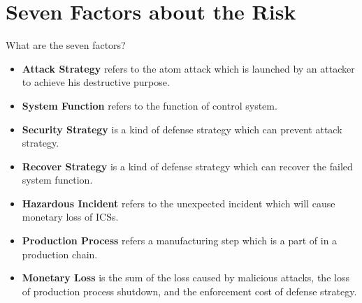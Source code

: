 \documentclass[10pt]{beamer}
\begin{document}
\section{Seven Factors about the Risk}
\begin{frame}{What are the seven factors?}
    \begin{itemize}[<+->]
      \item \textbf{Attack Strategy} refers to the atom attack which is launched by an attacker to achieve his destructive purpose.
      \item \textbf{System Function} refers to the function of control system.
      \item \textbf{Security Strategy} is a kind of defense strategy which can prevent attack strategy.
      \item \textbf{Recover Strategy} is a kind of defense strategy which can recover the failed system function.
      \item \textbf{Hazardous Incident} refers to the unexpected incident which will cause monetary loss of ICSs.
      \item \textbf{Production Process} refers a manufacturing step which is a part of in a production chain.
      \item \textbf{Monetary Loss} is the sum of the loss caused by malicious attacks, the loss of production process shutdown, and the enforcement cost of defense strategy.
    \end{itemize}
\end{frame}
\end{document}
